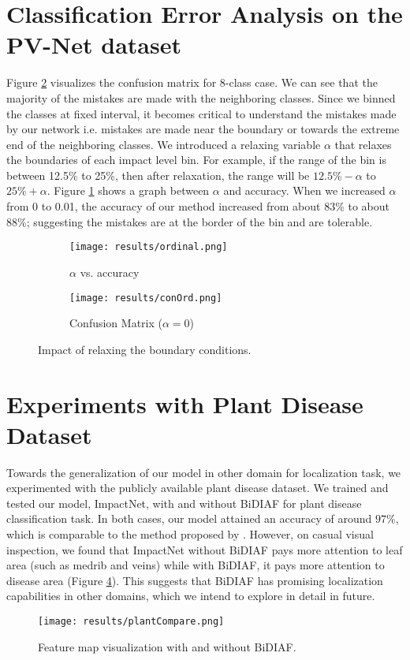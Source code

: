 \documentclass[10pt,twocolumn,letterpaper]{article}
\begin{document}
\section{Classification Error Analysis on the PV-Net dataset}
\label{sec:errAna}
Figure \ref{fig:conmat} visualizes the confusion matrix for 8-class case. We can see that the majority of the mistakes are made with the neighboring classes. Since we binned the classes at fixed interval, it becomes critical to understand the mistakes made by our network i.e. mistakes are made near the boundary or towards the extreme end of the neighboring classes. We introduced a relaxing variable $\alpha$ that relaxes the boundaries of each impact level bin. For example, if the range of the bin is between 12.5\% to 25\%, then after relaxation, the range will be $12.5\% - \alpha$ to $25\% + \alpha$. Figure \ref{fig:ovp} shows a graph between $\alpha$ and accuracy. When we increased $\alpha$ from 0 to 0.01, the accuracy of our method increased from about 83\% to about 88\%; suggesting the mistakes are at the border of the bin and are tolerable.

\begin{figure}[t!]
	\centering
	\begin{subfigure}{0.8\columnwidth}
		\texttt{[image: results/ordinal.png]}
		\caption{$\alpha$ vs. accuracy}
		\label{fig:ovp}
	\end{subfigure}
	\vfill
	\begin{subfigure}{0.8\columnwidth}
		\texttt{[image: results/conOrd.png]} 
		\caption{Confusion Matrix ($\alpha=0$)}
		\label{fig:conmat}
	\end{subfigure}
	\caption{Impact of relaxing the boundary conditions.}
	\label{fig:relaxBound}
\end{figure}

\section{Experiments with Plant Disease Dataset}
\label{sec:plantRes}
Towards the generalization of our model in other domain for localization task, we experimented with the publicly available plant disease dataset. We trained and tested our model, ImpactNet, with and without BiDIAF for plant disease classification task. In both cases, our model attained an accuracy of around $97\%$, which is comparable to the method proposed by \cite{sladojevic2016deep}. However, on casual visual inspection, we found that ImpactNet without BiDIAF pays more attention to leaf area (such as medrib and veins) while with BiDIAF, it pays more attention to disease area (Figure \ref{fig:plantComp}). This suggests that BiDIAF has promising localization capabilities in other domains, which we intend to explore in detail in future.  
\begin{figure}[t!]
	\centering
	\texttt{[image: results/plantCompare.png]}
	\caption{Feature map visualization with and without BiDIAF.}
	\label{fig:plantComp}
\end{figure}
\end{document}
